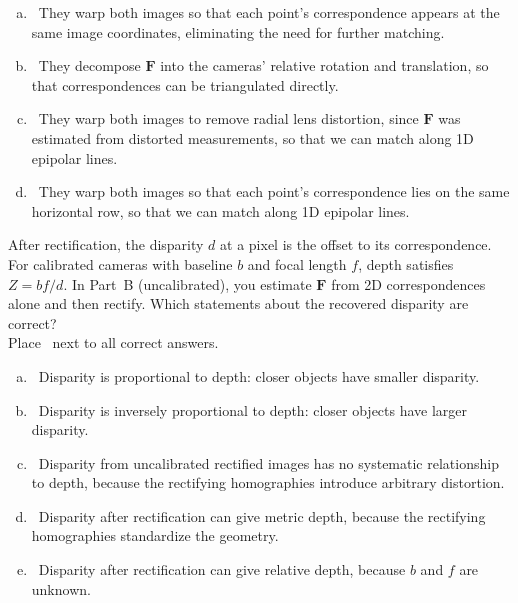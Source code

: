 \documentclass{csci1430}
\begin{document}
\begin{answer}[height=11]
\begin{enumerate}[(a),leftmargin=12pt]
    \item \cbox~They warp both images so that each point's correspondence appears at the same image coordinates, eliminating the need for further matching.
    \item \cbox~They decompose $\mathbf{F}$ into the cameras' relative rotation and translation, so that correspondences can be triangulated directly.
    \item \cbox~They warp both images to remove radial lens distortion, since $\mathbf{F}$ was estimated from distorted measurements, so that we can match along 1D epipolar lines.
    \item \cbox~They warp both images so that each point's correspondence lies on the same horizontal row, so that we can match along 1D epipolar lines.
\end{enumerate}
\end{answer}


\begin{subquestion}[points=4]
After rectification, the disparity $d$ at a pixel is the offset to its correspondence. For calibrated cameras with baseline $b$ and focal length $f$, depth satisfies $Z = bf/d$. In Part~B (uncalibrated), you estimate $\mathbf{F}$ from 2D correspondences alone and then rectify. Which statements about the recovered disparity are correct? \\
Place \filled~next to all correct answers.
\end{subquestion}

\begin{answer}[height=11]
\begin{enumerate}[(a),leftmargin=12pt]
    \item \cbox~Disparity is proportional to depth: closer objects have smaller disparity.
    \item \cbox~Disparity is inversely proportional to depth: closer objects have larger disparity.
    \item \cbox~Disparity from uncalibrated rectified images has no systematic relationship to depth, because the rectifying homographies introduce arbitrary distortion.
    \item \cbox~Disparity after rectification can give metric depth, because the rectifying homographies standardize the geometry.
    \item \cbox~Disparity after rectification can give relative depth, because $b$ and $f$ are unknown.
\end{enumerate}
\end{answer}


\pagebreak

\writefeedback
\end{document}
